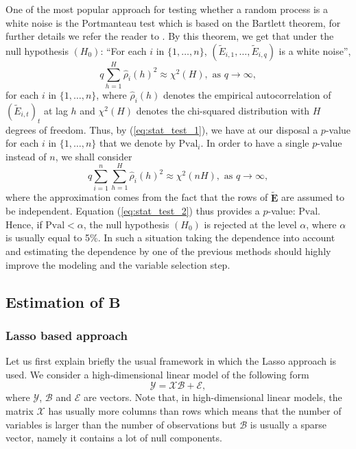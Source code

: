 One of the most popular approach for testing whether a random process
is a white noise is the Portmanteau test which is based on the
Bartlett theorem, for further details we refer the reader to
\cite[Theorem 7.2.2]{brockwell:davis}. By this theorem, we get that
under the null hypothesis $(H_0)$: ``For each $i$ in $\{1,\dots,n\}$,
$(\widetilde{E}_{i,1},\ldots,\widetilde{E}_{i,q})$ is a white noise'',
\begin{equation}\label{eq:stat_test_1}
q\sum_{h=1}^H \widehat{\rho}_i(h)^2\approx \chi^2(H),\textrm{ as }
q\to\infty,
\end{equation}
for each $i$ in $\{1,\dots,n\}$,
where $\widehat{\rho}_i(h)$ denotes the empirical autocorrelation of
$(\widetilde{E}_{i,t})_t$ at lag $h$ and $\chi^2(H)$ denotes the
chi-squared distribution with $H$ degrees of freedom. Thus, by (\ref{eq:stat_test_1}),
we have at our disposal a $p$-value for each $i$ in $\{1,\dots,n\}$
that we denote by $\textrm{Pval}_i$.
In order to have a single $p$-value instead of $n$, we shall consider 
\begin{equation}\label{eq:stat_test_2}
q\sum_{i=1}^n\sum_{h=1}^H \widehat{\rho}_i(h)^2\approx \chi^2(nH),\textrm{ as }
q\to\infty,
\end{equation}
where the approximation comes from the fact that the rows of $\widetilde{\boldsymbol{E}}$
are assumed to be independent. Equation (\ref{eq:stat_test_2}) thus provides a $p$-value: $\textrm{Pval}$.
Hence, if $\textrm{Pval}<\alpha$, the null hypothesis $(H_0)$ is
rejected at the level $\alpha$, where $\alpha$ is usually equal to 5\%. In such a situation taking the dependence into account and estimating the dependence
by one of the previous methods should highly improve the modeling and the variable selection step.

\subsection{Estimation of $\boldsymbol{B}$}\label{sec:lasso}

\subsubsection{Lasso based approach}

Let us first explain briefly the usual framework in which the Lasso
approach is used. We consider a high-dimensional linear model of the following form
\begin{equation}\label{eq:model_vec}
\mathcal{Y}=\mathcal{X}\mathcal{B}+\mathcal{E},
\end{equation}
where $\mathcal{Y}$, $\mathcal{B}$ and $\mathcal{E}$ are vectors. Note that, in
high-dimensional linear models, the matrix $\mathcal{X}$ has usually more columns than rows which means that
the number of variables is larger than the number of observations but
$\mathcal{B}$ is usually a sparse vector, namely it contains a lot of
null components.

